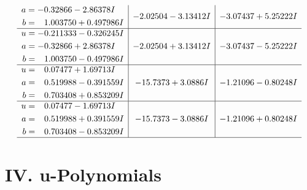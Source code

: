 \documentclass[1p]{elsarticle_modified}
\theoremstyle{definition}
\begin{document}
$$\begin{array}{c|c|c}
\begin{aligned}
a &= -0.32866 - 2.86378 I \\
b &= \phantom{-}1.003750 + 0.497986 I\end{aligned}
 & -2.02504 - 3.13412 I & -3.07437 + 5.25222 I \\ \hline\begin{aligned}
u &= -0.211333 - 0.326245 I \\
a &= -0.32866 + 2.86378 I \\
b &= \phantom{-}1.003750 - 0.497986 I\end{aligned}
 & -2.02504 + 3.13412 I & -3.07437 - 5.25222 I \\ \hline\begin{aligned}
u &= \phantom{-}0.07477 + 1.69713 I \\
a &= \phantom{-}0.519988 - 0.391559 I \\
b &= \phantom{-}0.703408 + 0.853209 I\end{aligned}
 & -15.7373 + 3.0886 I & -1.21096 - 0.80248 I \\ \hline\begin{aligned}
u &= \phantom{-}0.07477 - 1.69713 I \\
a &= \phantom{-}0.519988 + 0.391559 I \\
b &= \phantom{-}0.703408 - 0.853209 I\end{aligned}
 & -15.7373 - 3.0886 I & -1.21096 + 0.80248 I\\
 \hline 
 \end{array}$$\newpage
\newpage\renewcommand{\arraystretch}{1}
\centering \section*{ IV. u-Polynomials}
\end{document}
